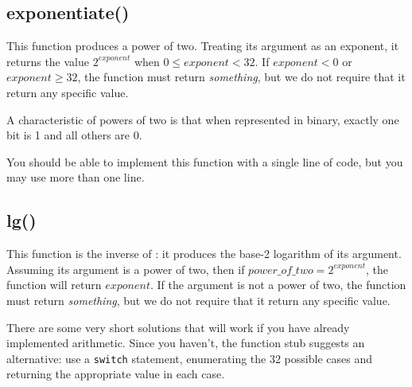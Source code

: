 \begin{description}
\end{description}


\subsection{exponentiate()}

This function produces a power of two.
Treating its argument as an exponent, it returns the value $2^{exponent}$ when $0 \le exponent < 32$.
If $exponent < 0$ or $exponent \ge 32$, the function must return \textit{something}, but we do not require that it return any specific value.

A characteristic of powers of two is that when represented in binary, exactly one bit is 1 and all others are 0.

\begin{description}
\end{description}
You should be able to implement this function with a single line of code,
but you may use more than one line.


\subsection{lg()}

This function is the inverse of :
it produces the base-2 logarithm of its argument.
Assuming its argument is a power of two, then if $power\_of\_two = 2^{exponent}$, the function will return $exponent$.
If the argument is not a power of two, the function must return \textit{something}, but we do not require that it return any specific value.


There are some very short solutions that will work if you have already implemented arithmetic.
Since you haven't, the function stub suggests an alternative:
use a \lstinline{switch} statement, enumerating the 32 possible cases and returning the appropriate value in each case.

